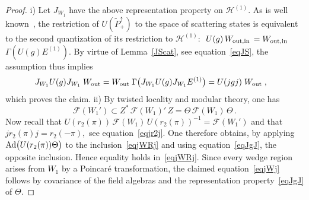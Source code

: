 \documentclass[a4paper,reqno,11pt]{amsart}
\theoremstyle{plain}
\theoremstyle{definition}
\numberwithin{equation}{section}
\newcommand{\F}{{\mathcal F}}
\newcommand{\calH}{{\mathcal H}}
\newcommand{\Potild}{\tilde{P}_+^{\uparrow}}
\newcommand{\He}{\calH^{(1)}}
\newcommand{\Out}{{\rm out} }
\newcommand{\In}{{\rm in} }
\newcommand{\JWR}{J_{W_1}}  %
\newcommand{\Ee}{E^{(1)}}
\newcommand{\CPTop}{\Theta} %
\begin{document}
\begin{proof}
i) Let $\JWR$ have the above  representation property on $\He.$ As is well  
known~\cite{DHRIV}, the restriction of $U(\Potild)$
to the space of scattering states is equivalent to the second 
quantization of its restriction to $\He:\,$ 
$U(g)\,W_{\Out,\In}$ $=W_{\Out,\In}\,$ $\Gamma(U(g)\Ee).$  By virtue of 
Lemma~\ref{JScat}, see equation~\eqref{eqJS}, the assumption thus implies 
\begin{align*}
\JWR U(g)\JWR\;W_{\Out}&=W_{\Out}\;\Gamma\big(\JWR U(g)\JWR\Ee\big) =
U(jgj)\;W_{\Out}\;, 
\end{align*}
which proves the claim. 
ii) By twisted locality and modular theory, one has 
\begin{equation} \label{eqjWRj} 
\F(W_1') \subset Z^*\,\F(W_1)'\,Z=\CPTop\,\F(W_1)\,\CPTop\,.
\end{equation}
Now recall that %
$U(r_2(\pi))\,\F(W_1)\,U(r_2(\pi))^{-1}=\F(W_1')$  and that
$jr_2(\pi)j=r_2(-\pi),$ see equation~\eqref{eqjr2j}. 
One therefore obtains, by applying
${\rm Ad}\big(U(r_2(\pi))\CPTop\big)$ to the inclusion~\eqref{eqjWRj} 
and using equation~\eqref{eqJgJ}, the opposite inclusion. 
Hence equality holds in~\eqref{eqjWRj}. Since every
wedge region arises from $W_1$ by a Poincar\'e transformation, 
the claimed equation~\eqref{eqjWj} follows by covariance of the field
algebras and the representation property~\eqref{eqJgJ} of $\CPTop.$ 
\end{proof}
\appendix
\end{document}
